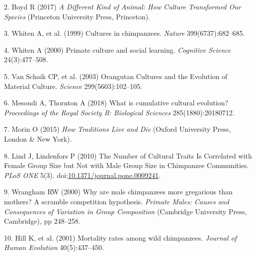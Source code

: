 \documentclass[9pt,twocolumn,twoside,]{pnas-new}
\begin{document}
\hypertarget{ref-boyd_different_2017}{}
2. Boyd R (2017) \emph{A Different Kind of Animal: How Culture
Transformed Our Species} (Princeton University Press, Princeton).

\hypertarget{ref-whiten_cultures_1999}{}
3. Whiten A, et al. (1999) Cultures in chimpanzees. \emph{Nature}
399(6737):682--685.

\hypertarget{ref-whiten_primate_2000}{}
4. Whiten A (2000) Primate culture and social learning. \emph{Cognitive
Science} 24(3):477--508.

\hypertarget{ref-van_schaik_orangutan_2003}{}
5. Van Schaik CP, et al. (2003) Orangutan Cultures and the Evolution of
Material Culture. \emph{Science} 299(5603):102--105.

\hypertarget{ref-mesoudi_what_2018}{}
6. Mesoudi A, Thornton A (2018) What is cumulative cultural evolution?
\emph{Proceedings of the Royal Society B: Biological Sciences}
285(1880):20180712.

\hypertarget{ref-morin_how_2015}{}
7. Morin O (2015) \emph{How Traditions Live and Die} (Oxford University
Press, London \& New York).

\hypertarget{ref-lind_number_2010}{}
8. Lind J, Lindenfors P (2010) The Number of Cultural Traits Is
Correlated with Female Group Size but Not with Male Group Size in
Chimpanzee Communities. \emph{PLoS ONE} 5(3).
doi:\href{https://doi.org/10.1371/journal.pone.0009241}{10.1371/journal.pone.0009241}.

\hypertarget{ref-wrangham_why_2000}{}
9. Wrangham RW (2000) Why are male chimpanzees more gregarious than
mothers? A scramble competition hypothesis. \emph{Primate Males: Causes
and Consequences of Variation in Group Composition} (Cambridge
University Press, Cambridge), pp 248--258.

\hypertarget{ref-hill_mortality_2001}{}
10. Hill K, et al. (2001) Mortality rates among wild chimpanzees.
\emph{Journal of Human Evolution} 40(5):437--450.



% 
\end{document}
